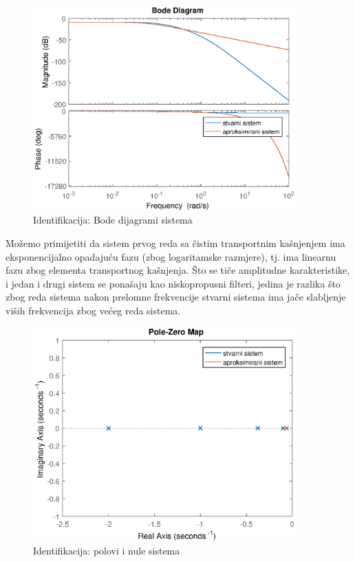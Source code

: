 \begin{figure} [H]
  \centering
  \includegraphics[width=0.9\textwidth]{z1_4}
  \caption{Identifikacija: Bode dijagrami sistema}
  \label{fig:z1_4}
\end{figure}
 

Možemo primijetiti da sistem prvog reda sa čistim transportnim kašnjenjem ima eksponencijalno opadajuću fazu (zbog logaritamske razmjere), tj. ima linearnu fazu zbog elementa transportnog kašnjenja. Što se tiče amplitudne karakteristike, i jedan i drugi sistem se ponašaju kao niskopropusni filteri, jedina je razlika što zbog reda sistema nakon prelomne frekvencije stvarni sistema ima jače slabljenje viših frekvencija zbog većeg reda sistema.
 
 \begin{figure} [H]
  \centering
  \includegraphics[width=0.9\textwidth]{z1_5}
  \caption{Identifikacija: polovi i nule sistema}
  \label{fig:z1_5}
\end{figure}
 
